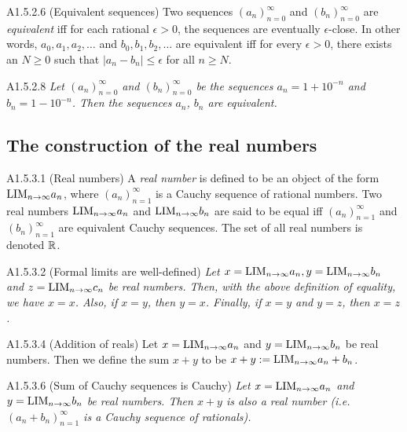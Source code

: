 \begin{definition}{A1.5.2.6}
    (Equivalent sequences) Two sequences $(a_n)_{n=0}^{\infty}$ and $(b_n)_{n=0}^{\infty}$
    are \emph{equivalent} iff for each rational $\epsilon > 0$, the sequences are eventually
    $\epsilon$-close. In other words, $a_0, a_1, a_2, \ldots$ and $b_0, b_1, b_2, \ldots$
    are equivalent iff for every $\epsilon > 0$, there exists an $N \geq 0$ such that
    $|a_n - b_n| \leq \epsilon$ for all $n \geq N$.
\end{definition}

\begin{proposition}{A1.5.2.8}
    \emph{Let $(a_n)_{n=0}^{\infty}$ and $(b_n)_{n=0}^{\infty}$ be the sequences
    $a_n = 1 + 10^{-n}$ and $b_n = 1 - 10^{-n}$. Then the sequences $a_n$, $b_n$
    are equivalent.}
\end{proposition}

\subsection{The construction of the real numbers}
\begin{definition}{A1.5.3.1}
    (Real numbers) A \emph{real number} is defined to be an object of the form
    $\text{LIM}_{n \rightarrow \infty}{a_n}$, where $(a_n)_{n=1}^{\infty}$ is a Cauchy sequence
    of rational numbers. Two real numbers $\text{LIM}_{n \rightarrow \infty}{a_n}$ and
    $\text{LIM}_{n \rightarrow \infty}{b_n}$ are said to be equal iff $(a_n)_{n=1}^{\infty}$
    and $(b_n)_{n=1}^{\infty}$ are equivalent Cauchy sequences. The set of all
    real numbers is denoted $\mathbb{R}$.
\end{definition}

\begin{proposition}{A1.5.3.2}
    (Formal limits are well-defined) \emph{Let $x = \text{LIM}_{n \rightarrow \infty}{a_n}, y = \text{LIM}_{n \rightarrow \infty}{b_n}$
    and $z = \text{LIM}_{n \rightarrow \infty}{c_n}$ be real numbers. Then, with the above definition
    of equality, we have $x = x$. Also, if $x = y$, then $y = x$. Finally, if
    $x = y$ and $y = z$, then $x = z$.}
\end{proposition}

\begin{definition}{A1.5.3.4}
    (Addition of reals) Let $x = \text{LIM}_{n \rightarrow \infty}{a_n}$ and $y = \text{LIM}_{n \rightarrow \infty}{b_n}$
    be real numbers. Then we define the sum $x + y$ to be $x + y := \text{LIM}_{n \rightarrow \infty}{a_n + b_n}$.
\end{definition}

\begin{lemma}{A1.5.3.6}
    (Sum of Cauchy sequences is Cauchy) \emph{Let $x = \text{LIM}_{n \rightarrow \infty}{a_n}$ and $y = \text{LIM}_{n \rightarrow \infty}{b_n}$
    be real numbers. Then $x + y$ is also a real number (i.e. $(a_n + b_n)_{n = 1}^{\infty}$
    is a Cauchy sequence of rationals).}
\end{lemma}

